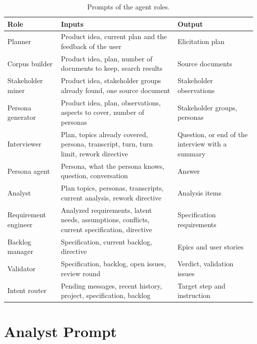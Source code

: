 \begin{appendices}
\begin{table}[H]
    \centering
    \small
    \caption{Prompts of the agent roles.}
    \label{tab:apx-prompts}
    \begin{tabularx}{\linewidth}{|l|X|p{3.4cm}|}
        \hline
        \textbf{Role} & \textbf{Inputs} & \textbf{Output} \\
        \hline
        Planner & Product idea, current plan and the feedback of the user & Elicitation plan \\ \hline
        Corpus builder & Product idea, plan, number of documents to keep, search results & Source documents \\ \hline
        Stakeholder miner & Product idea, stakeholder groups already found, one source document & Stakeholder observations \\ \hline
        Persona generator & Product idea, plan, observations, aspects to cover, number of personas & Stakeholder groups, personas \\ \hline
        Interviewer & Plan, topics already covered, persona, transcript, turn, turn limit, rework directive & Question, or end of the interview with a summary \\ \hline
        Persona agent & Persona, what the persona knows, question, conversation & Answer \\ \hline
        Analyst & Plan topics, personas, transcripts, current analysis, rework directive & Analysis items \\ \hline
        Requirement engineer & Analyzed requirements, latent needs, assumptions, conflicts, current specification, directive & Specification requirements \\ \hline
        Backlog manager & Specification, current backlog, directive & Epics and user stories \\ \hline
        Validator & Specification, backlog, open issues, review round & Verdict, validation issues \\ \hline
        Intent router & Pending messages, recent history, project, specification, backlog & Target step and instruction \\ \hline
    \end{tabularx}
\end{table}

\section{Analyst Prompt}
\label{apx:analyst-prompt}
{

}





\end{appendices}
